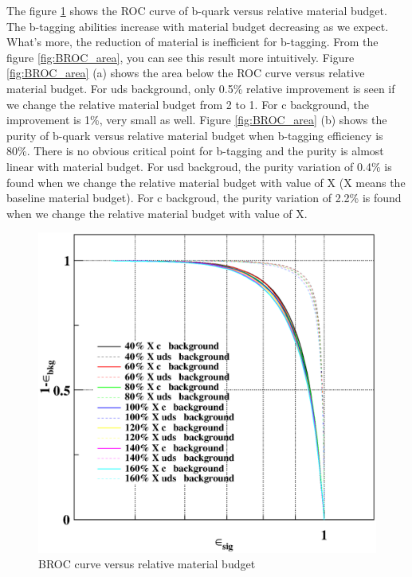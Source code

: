 \documentclass[usetikz]{style/cepcnote}
\begin{document}
The figure \ref{fig:BROC_material} shows the ROC curve of b-quark versus relative material budget. The b-tagging abilities increase with material budget decreasing as we expect. What's more, the reduction of material is inefficient for b-tagging. From the figure \ref{fig:BROC_area}, you can see this result more intuitively. Figure \ref{fig:BROC_area} (a) shows the area below the ROC curve versus relative material budget. For uds background, only 0.5\% relative improvement is seen if we change the relative material budget from 2 to 1. For c background, the improvement is 1\%, very small as well. Figure \ref{fig:BROC_area} (b) shows the purity of b-quark versus relative material budget when b-tagging efficiency is 80\%. There is no obvious critical point for b-tagging and the purity is almost linear with material budget.  For usd backgroud, the purity variation of 0.4\% is found when we change the relative material budget with value of X (X means the baseline material budget). For c backgroud, the purity variation of 2.2\% is found when we change the relative material budget with value of X.
\begin{figure}[!ht]
	\centering
	\includegraphics[scale=0.5]{figures/BROC-lcfiweights-test.eps}
	\caption{BROC curve versus relative material budget}
	\label{fig:BROC_material}
\end{figure}
\end{document}
